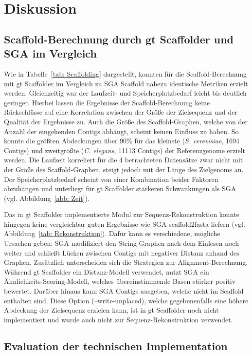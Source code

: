\documentclass[a4paper,11pt,parskip,abstract=on]{scrartcl}
\begin{document}
\section{Diskussion}
\label{sec: Diskussion}

\subsection{Scaffold-Berechnung durch gt Scaffolder und SGA im Vergleich}

Wie in Tabelle~\ref{tab: Scaffolding} dargestellt, konnten für die
Scaffold-Berechnung mit gt Scaffolder im Vergleich zu SGA Scaffold
nahezu identische Metriken erzielt werden. Gleichzeitig war der
Laufzeit- und Speicherplatzbedarf leicht bis deutlich geringer.
Hierbei lassen die Ergebnisse der Scaffold-Berechnung keine
Rückschlüsse auf eine Korrelation zwischen der Größe der Zielsequenz
und der Qualität der Ergebnisse zu. Auch die Größe des
Scaffold-Graphen, welche von der Anzahl der eingehenden Contigs
abhängt, scheint keinen Einfluss zu haben. So konnte die größten
Abdeckungen über 90\% für das kleinste (\textit{S.  cerevisiae}, 1694
Contigs) und zweitgrößte (\textit{C. elegans}, 11113 Contigs) der
Referenzgenome erzielt werden.  Die Laufzeit korreliert für die 4
betrachteten Datensätze zwar nicht mit der Größe des Scaffold-Graphen,
steigt jedoch mit der Länge des Zielgenoms an. Der Speicherplatzbedarf
scheint von einer Kombination beider Faktoren abzuhängen und
unterliegt für gt Scaffolder stärkeren Schwankungen als SGA (vgl.
Abbildung~\ref{abb: Zeit}).

Das in gt Scaffolder implementierte Modul zur Sequenz-Rekonstruktion konnte
hingegen keine vergleichbar guten Ergebnisse wie SGA scaffold2fasta liefern
(vgl. Abbildung~\ref{tab: Rekonstruktion}). Dafür kann es verschiedene, mögliche
Ursachen geben: SGA modifiziert den String-Graphen nach dem Einlesen noch
weiter und schließt Lücken zwischen Contigs mit negativer Distanz anhand des
Graphen. Zusätzlich unterscheiden sich die Strategien zur
Alignment-Berechnung. Während gt Scaffolder ein Distanz-Modell verwendet,
nutzt SGA ein Ähnlichkeits-Scoring-Modell, welches übereinstimmende Basen
stärker positiv bewertet. Darüber hinaus kann SGA Contigs ausgeben, welche
nicht im Scaffold enthalten sind. Diese Option (--write-unplaced), welche
gegebenenfalls eine höhere Abdeckung der Zielsequenz erzielen kann, ist in gt
Scaffolder noch nicht implementiert und wurde auch nicht zur
Sequenz-Rekonstruktion verwendet.

\subsection{Evaluation der technischen Implementation}
\end{document}
